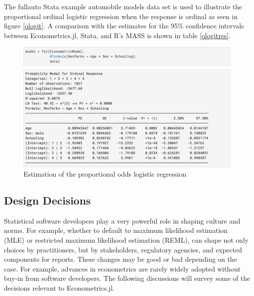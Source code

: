 \documentclass{juliacon}
\begin{document}
The fullauto Stata example automobile models data set is used to illustrate the proportional ordinal logistic regression when the response is ordinal as seen in figure \vref{ologit}. A comparison with the estimates for the 95\% confidence intervals between Econometrics.jl, Stata, and R's MASS is shown in table \vref{ologitres}.

\begin{figure}[hbpt]
	\includegraphics[max width=\linewidth,center]{estimator_ologit}
	\caption{Estimation of the proportional odds logistic regression}
	\label{ologit}
\end{figure}

\subsection{Design Decisions}

Statistical software developers play a very powerful role in shaping culture and norms. For example, whether to default to maximum likelihood estimation (MLE) or restricted maximum likelihood estimation (REML), can shape not only choices by practitioners, but by stakeholders, regulatory agencies, and expected components for reports. These changes may be good or bad depending on the case. For example, advances in econometrics are rarely widely adopted without buy-in from software developers. The following discussions will survey some of the decisions relevant to Econometrics.jl.
\end{document}
